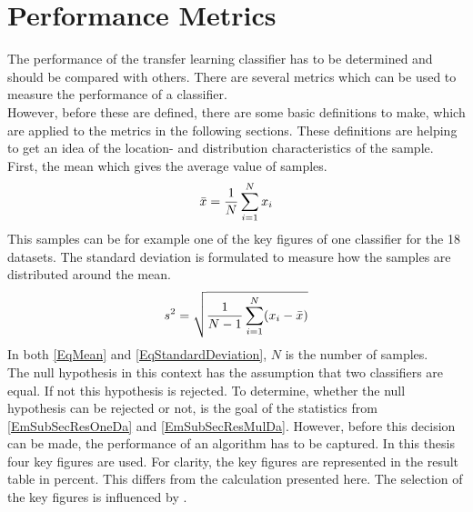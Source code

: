 \section{Performance Metrics}\label{EmSubSecPerMet}
The performance of the transfer learning classifier has to be determined and should be compared with others.
There are several metrics which can be used to measure the performance of a classifier.\\
However, before these are defined, there are some basic definitions to make, which are applied to the metrics in the following sections.
These definitions are helping to get an idea of the location- and distribution characteristics of the sample.\cite[p. 216-217]{Teschl.2014}
First, the mean which gives the average value of samples. 
\begin{equation}\label{EqMean}
	\bar{x} = \frac{1}{N}\sum_{i=1}^{N}x_i
\end{equation}
This samples can be for example one of the key figures of one classifier for the 18 datasets. 
The standard deviation is formulated to measure how the samples are distributed around the mean.
\begin{equation}\label{EqStandardDeviation}
s^2=\sqrt{\frac{1}{N-1}\sum_{i=1}^{N}(x_i-\bar{x})}
\end{equation}
In both \eqref{EqMean} and \eqref{EqStandardDeviation}, $N$ is the number of samples. \\
The null hypothesis in this context has the assumption that two classifiers are equal.
If not this hypothesis is rejected.\cite{Alpaydm.1999} 
To determine, whether the null hypothesis can be rejected or not, is the goal of the statistics from \ref{EmSubSecResOneDa} and \ref{EmSubSecResMulDa}.
However, before this decision can be made, the performance of an algorithm has to be captured.
In this thesis four key figures are used.
For clarity, the key figures are represented in the result table in percent.
This differs from the calculation presented here.
The selection of the key figures is influenced by \cite{Chen.2009}.\\
